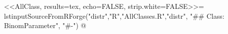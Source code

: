 <<AllClass, results=tex, echo=FALSE, strip.white=FALSE>>=
lstinputSourceFromRForge("distr","R","AllClasses.R","distr",
                     "## Class: BinomParameter", "#-")
@
